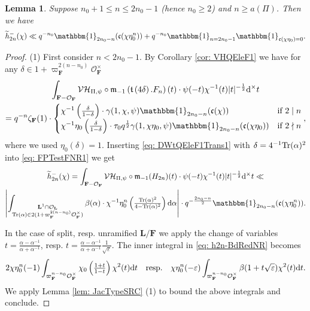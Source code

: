 \documentclass[A4]{amsart}
\def\leq{\leqslant}
\def\geq{\geqslant}
\newtheorem{lemma}      [theorem]{Lemma}
\numberwithin{equation}{section} \everymath{\displaystyle}
\newcommand{\Tr}{{\rm Tr}}
\newcommand{\id}{\mathbbm{1}}
\newcommand{\ud}{\mathrm{d}}
\newcommand{\F}{\mathbf{F}}
\newcommand{\bL}{\mathbf{L}}
\newcommand{\vO}{\mathcal{O}}
\newcommand{\norm}[1][\cdot]{\lvert #1 \rvert}
\newcommand{\extnorm}[1]{\left\lvert #1 \right\rvert}
\newcommand{\Mult}{\mathfrak{m}}
\newcommand{\VorH}{\mathcal{VH}}
\newcommand{\Trans}{\mathfrak{t}}
\newcommand{\cond}{\mathfrak{c}}
\begin{document}
\begin{lemma} \label{lem: e1DWt-FineBd1}
	Suppose $n_0 + 1 \leq n \leq 2n_0 - 1$ (hence $n_0 \geq 2$) and $n \geq a(\Pi)$. Then we have
	$$ \widetilde{h}_{2n}^-(\chi) \ll q^{-n_0} \id_{2n_0-n}(\cond(\chi \eta_0^n)) + q^{-n_0} \id_{n=2n_0-1} \id_{\cond(\chi \eta_0)=0}. $$
\end{lemma}
\begin{proof}
	(1) First consider $n < 2n_0-1$. By Corollary \ref{cor: VHQEleF1} we have for any $\delta \in 1+\varpi_{\F}^{2(n-n_0)} \vO_{\F}^{\times}$
\begin{multline} \label{eq: DWtQEleF1Trans1}
	\int_{\F-\vO_{\F}} \VorH_{\Pi,\psi} \circ \Mult_{-1} \left( \Trans \left( 4\delta \right).F_n \right)(t) \cdot \psi(-t) \chi^{-1}(t) \norm[t]^{-\frac{1}{2}} \ud^{\times} t \\
	= q^{-n} \zeta_{\F}(1) \cdot \begin{cases}
		\chi^{-1} \left( \tfrac{\delta}{1-\delta} \right) \cdot \gamma(1,\chi,\psi) \id_{2n_0-n}(\cond(\chi)) & \text{if } 2 \mid n \\
		\chi^{-1} \eta_0 \left( \tfrac{\delta}{1-\delta} \right) \cdot \tau_0 q^{\frac{1}{2}} \gamma(1,\chi \eta_0,\psi) \id_{2n_0-n}(\cond(\chi \eta_0)) & \text{if } 2 \nmid n
	\end{cases},
\end{multline}
	where we used $\eta_0(\delta)=1$. Inserting \eqref{eq: DWtQEleF1Trans1} with $\delta = 4^{-1} \Tr(\alpha)^2$ into \eqref{eq: FPTestFNR1} we get
\begin{multline} \label{eq: h2n-BdRedNR}
	\widetilde{h}_{2n}^-(\chi) = \int_{\F-\vO_{\F}} \VorH_{\Pi,\psi} \circ \Mult_{-1} (H_{2n})(t) \cdot \psi(-t) \chi^{-1}(t) \norm[t]^{-\frac{1}{2}} \ud^{\times} t \ll \\
	\extnorm{\int_{\substack{\bL^1 \cap \vO_{\bL} \\ \Tr(\alpha) \in 2(1+\varpi_{\F}^{2(n-n_0)} \vO_{\F}^{\times})}} \beta(\alpha) \cdot \chi^{-1} \eta_0^n \left( \tfrac{\Tr(\alpha)^2}{4-\Tr(\alpha)^2} \right) \ud \alpha} \cdot q^{-\frac{2n_0-n}{2}} \id_{2n_0-n}(\cond(\chi \eta_0^n)).
\end{multline}
	
\noindent In the case of split, resp. unramified $\bL/\F$ we apply the change of variables $t = \tfrac{\alpha - \alpha^{-1}}{\alpha + \alpha^{-1}}$, resp. $t = \tfrac{\alpha - \alpha^{-1}}{\alpha + \alpha^{-1}} \tfrac{1}{\sqrt{\varepsilon}}$. The inner integral in \eqref{eq: h2n-BdRedNR} becomes
	$$ 2 \chi\eta_0^n(-1) \int_{\varpi_{\F}^{n-n_0} \vO_{\F}^{\times}} \chi_0 \left( \tfrac{1+t}{1-t} \right) \chi^2(t) \ud t \quad {\rm resp.} \quad \chi\eta_0^n(-\varepsilon) \int_{\varpi_{\F}^{n-n_0} \vO_{\F}^{\times}} \beta(1+t \sqrt{\varepsilon}) \chi^2(t) \ud t. $$
	We apply Lemma \ref{lem: JacTypeSRC} (1) to bound the above integrals and conclude.
	

\end{proof}
\end{document}
